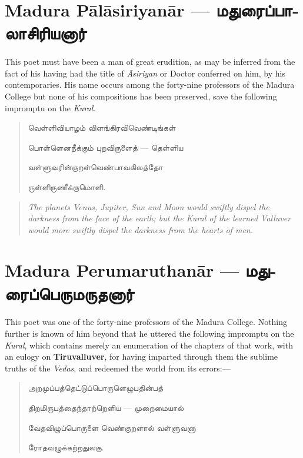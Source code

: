 \documentclass{article}
\newcommand{\TamilText}[1]{\texttamil{#1}}
\newcommand{\TamilBold}[1]{\texttamil{\textbf{#1}}}
\newcommand{\tam}[1]{\TamilText{#1}}
\newcommand{\tambold}[1]{\TamilBold{#1}}
\begin{document}
\section{Madura P\={a}l\={a}siriyan\={a}r --- \tambold{மதுரைப்பாலாசிரியனார்}}
\paragraph{}
This poet must have been a man of great erudition, as may be inferred from the fact of his having had the title of \emph{\={A}siriyan} or Doctor conferred on him, by his contemporaries. His name occurs among the forty-nine professors of the Madura College but none of his compositions has been preserved, save the following impromptu on the \emph{Kural}.
\begin{quotation}\small
\tam{வெள்ளிவியாழம்‌ விளங்கிரவிவெண்டிங்கள்‌}

\tam{பொள்ளெனநீக்கும்‌ புறவிருளைத்} --- \tam{தெள்ளிய}

\tam{வள்ளுவரின்குறள்வெண்பாவகிலத்தோ}

\tam{ருள்ளிருணீக்குமொளி}.
\end{quotation}
\begin{quotation}\small
\emph{The planets Venus, Jupiter, Sun and Moon would swiftly dispel the darkness from the face of the earth; but the Kural of the learned Valluver would more swiftly dispel the darkness from the hearts of men.}
\end{quotation}

\section{Madura Perumaruthan\={a}r --- \tambold{மதுரைப்பெருமருதனார்}}
\paragraph{}
This poet was one of the forty-nine professors of the Madura College. Nothing further is known of him beyond that he uttered the following impromptu on the \emph{Kural}, which contains merely an enumeration of the chapters of that work, with an eulogy on \textbf{Tiruvalluver}, for having imparted through them the sublime truths of the \emph{Vedas}, and redeemed the world from its errors:---
\begin{quotation}\small
\tam{அறமுப்பத்தெட்டுப்பொருளெழுபதின்பத்‌}

\tam{திறமிருபத்தைந்தாற்றெளிய} --- \tam{முறைமையால்‌}

\tam{வேதவிழுப்பொருளை வெண்குறளால்‌ வள்ளுவனா}

\tam{ரோதவழுக்கற்றதுலகு}.
\end{quotation}
\end{document}

